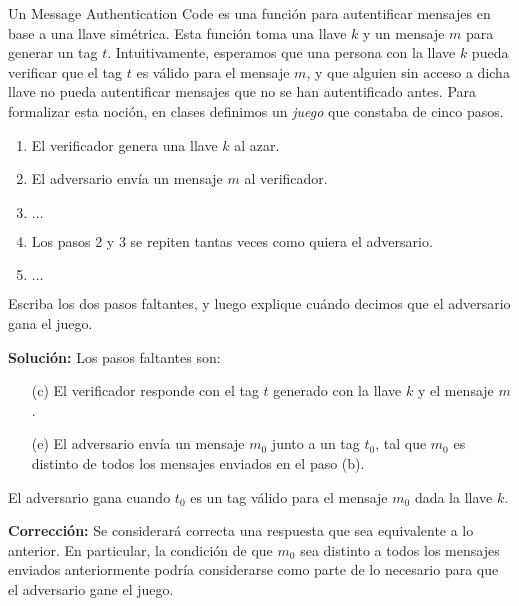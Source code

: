 
Un Message Authentication Code es una función para autentificar mensajes en base a una llave simétrica. Esta función toma una llave $k$ y un mensaje $m$ para generar un tag $t$. Intuitivamente, esperamos que una persona con la llave $k$ pueda verificar que el tag $t$ es válido para el mensaje $m$, y que alguien sin acceso a dicha llave no pueda autentificar mensajes que no se han autentificado antes. Para formalizar esta noción, en clases definimos un \emph{juego} que constaba de cinco pasos.
\begin{enumerate}
  \item El verificador genera una llave $k$ al azar.
  \item El adversario envía un mensaje $m$ al verificador.
  \item $\ldots$
  \item Los pasos 2 y 3 se repiten tantas veces como quiera el adversario.
  \item $\ldots$
\end{enumerate}
Escriba los dos pasos faltantes, y luego explique cuándo decimos que el adversario gana el juego.

\textbf{Solución:} Los pasos faltantes son:
\begin{itemize}
\item[(c)] El verificador responde con el tag $t$ generado con la llave $k$ y el mensaje $m$.
\item[(e)] El adversario envía un mensaje $m_0$ junto a un tag $t_0$, tal que $m_0$ es distinto de todos los mensajes enviados en el paso (b).
\end{itemize}
El adversario gana cuando $t_0$ es un tag válido para el mensaje $m_0$ dada la llave $k$.

\textbf{Corrección:} Se considerará correcta una respuesta que sea equivalente a lo anterior. En particular, la condición de que $m_0$ sea distinto a todos los mensajes enviados anteriormente podría considerarse como parte de lo necesario para que el adversario gane el juego.
